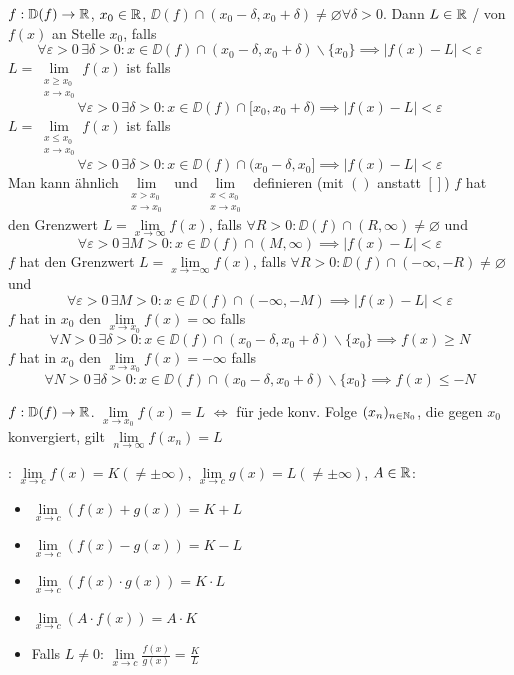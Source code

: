 \Def $f: \mathbb{D}(f) \to \mathbb{R}$, $x_0 \in \mathbb{R}$, $\DD(f) \cap (x_0 - \delta, x_0 + \delta)\ne \varnothing \forall \delta > 0$.
Dann $L \in \mathbb{R}$ / von $f(x)$ an Stelle $x_0$, falls
$$\forall \varepsilon > 0 \, \exists \delta > 0 : x \in \DD(f) \cap (x_0 - \delta, x_0 + \delta) \backslash \{x_0\} \implies |f(x) - L| < \varepsilon$$
$L = \lim\limits_{\substack{x\ge x_0 \\ x \to x_0}} f(x)$ ist  falls
$$\forall \varepsilon > 0 \, \exists \delta > 0 : x \in \DD(f) \cap [x_0, x_0 + \delta) \implies |f(x) - L| < \varepsilon$$
$L = \lim\limits_{\substack{x\le x_0 \\ x \to x_0}} f(x)$ ist  falls
$$\forall \varepsilon > 0 \, \exists \delta > 0 : x \in \DD(f) \cap (x_0 - \delta, x_0] \implies |f(x) - L| < \varepsilon$$
Man kann ähnlich $\lim\limits_{\substack{x > x_0 \\ x \to x_0}}$ und $\lim\limits_{\substack{x < x_0 \\ x \to x_0}}$
definieren (mit $()$ anstatt $[]$)
$f$ hat  den Grenzwert $L = \lim\limits_{x\to\infty}f(x)$, falls $\forall R > 0 : \DD(f) \cap (R, \infty) \ne \varnothing$ und
$$\forall \varepsilon > 0 \, \exists M > 0 : x \in \DD(f) \cap (M, \infty) \implies |f(x) - L| < \varepsilon$$
$f$ hat  den Grenzwert $L = \lim\limits_{x\to-\infty}f(x)$, falls $\forall R > 0 : \DD(f) \cap (-\infty, -R) \ne \varnothing$ und
$$\forall \varepsilon > 0 \, \exists M > 0 : x \in \DD(f) \cap (-\infty, -M) \implies |f(x) - L| < \varepsilon$$
$f$ hat in $x_0$ den  $\lim\limits_{x \to x_0}f(x) = \infty$ falls
$$\forall N > 0 \, \exists \delta > 0 : x \in \DD(f) \cap (x_0 - \delta, x_0 + \delta) \backslash \{x_0\} \implies f(x) \ge N$$
$f$ hat in $x_0$ den  $\lim\limits_{x \to x_0}f(x) = -\infty$ falls
$$\forall N > 0 \, \exists \delta > 0 : x \in \DD(f) \cap (x_0 - \delta, x_0 + \delta) \backslash \{x_0\} \implies f(x) \le -N$$

\Satz $f: \mathbb{D}(f) \to \mathbb{R}$. $\lim\limits_{x \to x_0} f(x) = L$ $\iff$ für jede konv. Folge $(x_n)_{n \in \mathbb{N}_0}$,
die gegen $x_0$ konvergiert, gilt $\lim\limits_{n\to\infty} f(x_n) = L$

\Satz {}: $\lim\limits_{x\to c} f(x) = K (\ne \pm \infty)$, $\lim\limits_{x\to c}g(x) = L (\ne \pm \infty)$, $A \in \mathbb{R}$:
\vspace{-0.6em}
\begin{itemize}
    \item $\lim\limits_{x\to c}(f(x) + g(x)) = K + L$
    \item $\lim\limits_{x\to c}(f(x) - g(x)) = K - L$
    \item $\lim\limits_{x\to c}(f(x) \cdot g(x)) = K \cdot L$
    \item $\lim\limits_{x\to c}(A \cdot f(x)) = A \cdot K$
    \item Falls $L \ne 0$: $\lim\limits_{x\to c}\frac{f(x)}{g(x)} = \frac{K}{L}$
\end{itemize}

